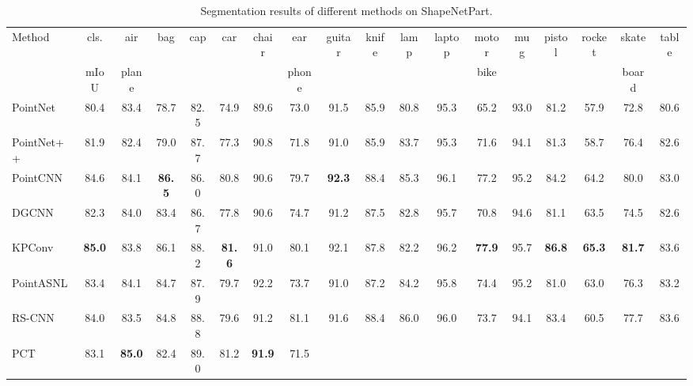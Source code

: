 \documentclass[10pt,twocolumn,letterpaper]{article}
\begin{document}
\begin{table*}
\small
\caption{Segmentation results of different methods on ShapeNetPart.} \label{tab:shapenet}
\begin{tabular}{l|@{ }c@{ }|@{ }c@{ }@{ }c@{ }@{ }c@{ }@{ }c@{ }@{ }c@{ }@{ }c@{ }@{ }c@{ }@{ }c@{ }@{ }c@{ }@{ }c@{ }@{ }c@{ }@{ }c@{ }@{ }c@{ }@{ }c@{ }@{ }c@{ }@{ }c@{ }}
\hline
\multirow{2}{*}{Method} & cls. & air   & \multirow{2}{*}{bag} & \multirow{2}{*}{cap} & \multirow{2}{*}{car} & \multirow{2}{*}{chair} & ear   & \multirow{2}{*}{guitar} & \multirow{2}{*}{knife} & \multirow{2}{*}{lamp} & \multirow{2}{*}{laptop} & motor & \multirow{2}{*}{mug} & \multirow{2}{*}{pistol} & \multirow{2}{*}{rocket} & skate & \multirow{2}{*}{table}  \\
&mIoU & plane & & & & & phone & & & & & bike & & & & board & \\ 
\hline
PointNet \cite{qi2017pointnet}    & 80.4 & 83.4 & 78.7 & 82.5 & 74.9 & 89.6 & 73.0 & 91.5 & 85.9 & 80.8 
                                       & 95.3 & 65.2 & 93.0 & 81.2 & 57.9 & 72.8 & 80.6 \\
PointNet++ \cite{qi2017pointnet2} & 81.9 & 82.4 & 79.0 & 87.7 & 77.3 & 90.8 & 71.8 & 91.0 & 85.9 & 83.7 
                                       & 95.3 & 71.6  & 94.1 & 81.3 & 58.7 & 76.4 & 82.6 \\
PointCNN \cite{pointcnn}   & 84.6 & 84.1 & \textbf{86.5} & 86.0 & 80.8 & 90.6 & 79.7 & \textbf{92.3} &                                      88.4 & 85.3 & 96.1 & 77.2 & 95.2 & 84.2 & 64.2 & 80.0 & 83.0 \\
DGCNN \cite{wang2019dynamic}    & 82.3 & 84.0 & 83.4 & 86.7 & 77.8 & 90.6 & 74.7 & 91.2 & 87.5 & 82.8 & 95.7
                                & 70.8 & 94.6 & 81.1 & 63.5 & 74.5 & 82.6 \\
KPConv \cite{thomas2019kpconv}  & \textbf{85.0} & 83.8 & 86.1 & 88.2 & \textbf{81.6} & 91.0 & 80.1 & 92.1 & 87.8 
                                & 82.2 & 96.2 & \textbf{77.9} & 95.7 & \textbf{86.8} & \textbf{65.3} &\textbf{81.7} & 83.6 \\
PointASNL \cite{pointasnl}    & 83.4 & 84.1 & 84.7 & 87.9 & 79.7 & 92.2 & 73.7 & 91.0 & 87.2 & 84.2                               & 95.8 & 74.4 & 95.2 & 81.0 & 63.0 & 76.3 & 83.2 \\
RS-CNN \cite{rsconv}          & 84.0 & 83.5 & 84.8 & 88.8 & 79.6 & 91.2 & 81.1 & 91.6 
                              & 88.4 & 86.0 & 96.0 & 73.7 & 94.1 & 83.4 & 60.5 & 77.7 & 83.6 \\
PCT \cite{guo2020pct}         & 83.1 & \textbf{85.0} & 82.4 & 89.0 & 81.2 & \textbf{91.9} & 71.5 

\end{tabular}
\end{table*}
\end{document}
